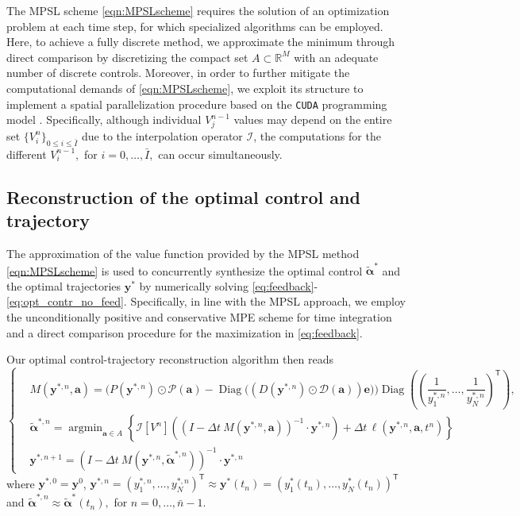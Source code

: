 \documentclass[10pt]{article}
\theoremstyle{remark}
\newcommand{\tpose}{^\mathsf{T}}
\DeclareMathOperator*{\argmin}{argmin}
\theoremstyle{definition}
\theoremstyle{remark}
\DeclareMathOperator{\Diag}{Diag}
\begin{document}
The MPSL scheme \eqref{eqn:MPSLscheme} requires the solution of an optimization problem at each time step, for which specialized algorithms can be employed. Here, to achieve a fully discrete method, we approximate the minimum through direct comparison by discretizing the compact set $A\subset \mathbb{R}^M$ with an adequate number of discrete controls. Moreover, in order to further mitigate the computational demands of \eqref{eqn:MPSLscheme}, we exploit its structure to implement a spatial parallelization procedure based on the \texttt{CUDA} programming model \cite{CudaGuide}. Specifically, although individual $V_j^{n-1}$ values may depend on the entire set $\{V_i^{n}\}_{0\leq i \leq \bar{I}}$ due to the interpolation operator $\mathcal{I}$, the computations for the different $V_i^{n-1},$ for $i=0,\dots, \bar{I},$ can occur simultaneously.

\subsection{Reconstruction of the optimal control and trajectory}\label{subsec:Opti_Traj}\label{sec:feedback_reconstruction}

The approximation of the value function provided by the MPSL method \eqref{eqn:MPSLscheme} is used to concurrently synthesize the optimal control $\tilde{\bm{\alpha}}^*$ and the optimal trajectories $\bm{y}^*$ by numerically solving \eqref{eq:feedback}-\eqref{eq:opt_contr_no_feed}. Specifically, in line with the MPSL approach, we employ the unconditionally positive and conservative MPE scheme for time integration and a direct comparison procedure for the maximization in \eqref{eq:feedback}.

Our optimal control-trajectory reconstruction algorithm then reads
\begin{equation}\label{eqn:feedback_rec_MPE}
\left\{
    \begin{aligned}
        & M(\bm{y}^{*,n}\!,\bm{a})=\Big(\!P(\bm{y}^{*,n})\odot \mathcal{P}(\bm{a}) -\Diag\!\big(\!\left(D(\bm{y}^{*,n})\odot \mathcal{D}(\bm{a})\right)\bm{e}\big)\!\Big) \Diag\!\left(\!\left(\dfrac{1}{y^{*,n}_1},\dots,\dfrac{1}{y^{*,n}_N}\right)^{\!\mathsf{T}}\right), \\
        & \tilde{\bm{\alpha}}^{*,n} = \argmin_{\bm{a} \in A} \left\{\mathcal{I} \left[ V^n\right]((I-\Delta t \ M(\bm{y}^{*,n},\bm{a}))^{-1} \cdot \bm{y}^{*,n})  + \Delta t \,\ell(\bm{y}^{*,n},\bm{a},t^n)\right\} \\
        & \bm{y}^{*,n+1} = (I-\Delta t \ M(\bm{y}^{*,n}, \tilde{\bm{\alpha}}^{*,n}))^{-1} \cdot \bm{y}^{*,n}
    \end{aligned}
\right.
\end{equation}
where $\bm{y}^{*,0}=\bm{y}^{0}$, $\bm{y}^{*,n}=(y_1^{*,n},\dots,y_N^{*,n})\tpose\approx\bm{y}^{*}(t_n)=(y_1^{*}(t_n),\dots,y_N^{*}(t_n))\tpose$ and $\tilde{\bm{\alpha}}^{*,n}\approx \tilde{\bm{\alpha}}^*(t_n),$ for $n=0,\dots,\bar{n}-1.$
\end{document}
